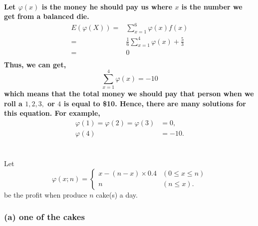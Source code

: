 \documentclass{article}
\begin{document}
        \paragraph{
            Let $\varphi(x)$ is the money he should pay us where $x$ is the number we get from a balanced die.
            \begin{equation*}
                \begin{split}
                    E(\varphi(X))=&\sum _{x=1} ^6 \varphi(x)f(x)\\
                        =&\frac{1}{6}\sum_{x=1} ^4 \varphi(x)+\frac{5}{3}\\
                        =&0\\
                \end{split}
            \end{equation*}
            Thus, we can get,
            $$\sum _{x=1} ^4 \varphi(x)=-10$$
            which means that the total money we should pay that person when we roll a $1,2,3,$ or $4$ is equal to \$10. Hence, there are many solutions for this equation. For example,
            \begin{equation*}
                \begin{split}
                    \varphi(1)=\varphi(2)=\varphi(3)&=0,\\
                    \varphi(4)&=-10.
                \end{split}
            \end{equation*}
        }
    

    \section{}
        \subsection{}
            Let 
            \begin{equation*}
                \varphi(x;n)=
                \begin{cases}
                    x-(n-x)\times 0.4 & (0\leq x\leq n)\\
                    n& (n\leq x).
                \end{cases}
            \end{equation*}
            be the profit when produce $n$ cake(s) a day.

            \subsubsection*{(a) one of the cakes}
\end{document}
